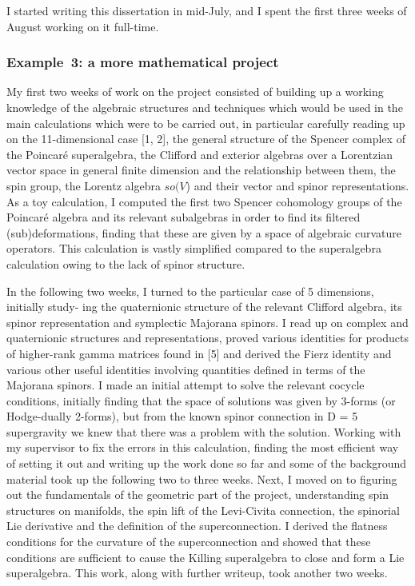 \documentclass[12pt,a4paper]{report}
\begin{document}
I started writing this dissertation in mid-July, and I spent the first
three weeks of August working on it full-time.


\subsubsection{Example~3: a more mathematical project}

My first two weeks of work on the project consisted of building up a
working knowledge of the algebraic structures and techniques which
would be used in the main calculations which were to be carried out,
in particular carefully reading up on the 11-dimensional case [1, 2],
the general structure of the Spencer complex of the Poincar\'e
superalgebra, the Clifford and exterior algebras over a Lorentzian
vector space in general finite dimension and the relationship between
them, the spin group, the Lorentz algebra $so(V$) and their vector and
spinor representations. As a toy calculation, I computed the first two
Spencer cohomology groups of the Poincar\'e algebra and its relevant
subalgebras in order to find its filtered (sub)deformations, finding
that these are given by a space of algebraic curvature operators. This
calculation is vastly simplified compared to the superalgebra
calculation owing to the lack of spinor structure.

In the following two weeks, I turned to the particular case of 5
dimensions, initially study- ing the quaternionic structure of the
relevant Clifford algebra, its spinor representation and symplectic
Majorana spinors. I read up on complex and quaternionic structures and
representations, proved various identities for products of higher-rank
gamma matrices found in [5] and derived the Fierz identity and various
other useful identities involving quantities defined in terms of the
Majorana spinors. I made an initial attempt to solve the relevant
cocycle conditions, initially finding that the space of solutions was
given by 3-forms (or Hodge-dually 2-forms), but from the known spinor
connection in D = 5 supergravity we knew that there was a problem with
the solution. Working with my supervisor to fix the errors in this
calculation, finding the most efficient way of setting it out and
writing up the work done so far and some of the background material
took up the following two to three weeks.  Next, I moved on to
figuring out the fundamentals of the geometric part of the project,
understanding spin structures on manifolds, the spin lift of the
Levi-Civita connection, the spinorial Lie derivative and the
definition of the superconnection. I derived the flatness conditions
for the curvature of the superconnection and showed that these
conditions are sufficient to cause the Killing superalgebra to close
and form a Lie superalgebra. This work, along with further writeup,
took another two weeks.
\end{document}
